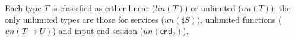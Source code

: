 \documentclass{easychair}
\newcommand{\key}{\mathsf}
\newcommand{\gvInput}[2]{\mathord{?}{#1}.{#2}}
\newcommand{\gvEndOutput}{\key{end}_!}
\newcommand{\gvEndInput}{\key{end}_?}
\newcommand{\gvService}[1]{\sharp {#1}}
\newcommand{\gvj}[3]{{#1} \vdash {#2} : {#3}}
\newcommand{\gvUnFun}[2]{{#1} \to {#2}}
\newcommand{\gvTimes}[2]{{#1} \otimes {#2}}
\newcommand{\gvLink}[2]{\key{link}~{#1}~{#2}}
\newcommand{\gvReceive}[1]{\key{receive}~{#1}}
\newcommand{\gvWith}[3]{\key{with}~{#1}~\key{connect}~{#2}~\key{to}~{#3}}
\newcommand{\gvTerminate}[1]{\key{terminate}~{#1}}
\newcommand{\gvSendType}[2]{\key{sendType}~{#1}~{#2}}
\newcommand{\gvReceiveType}[1]{\key{receiveType}~{#1}}
\newcommand{\gvServeOld}[3]{\key{serve}~{#1}({#2})={#3}}
\newcommand{\gvServe}[2]{\key{serve}~{#1}.{#2}}
\newcommand{\gvRequest}[1]{\key{request}~{#1}}
\newcommand{\un}[1]{\mathit{un}(#1)}
\newcommand{\lin}[1]{\mathit{lin}(#1)}
\newcommand{\hgv}{HGV\xspace}
\begin{document}





Each type $T$ is classified as either linear ($\lin{T}$) or unlimited ($\un{T}$); the only unlimited
types are those for services ($\un{\gvService{S}}$), unlimited functions ($\un{\gvUnFun{T}{U}}$) and
input end session ($\un{\gvEndInput}$).
\end{document}
